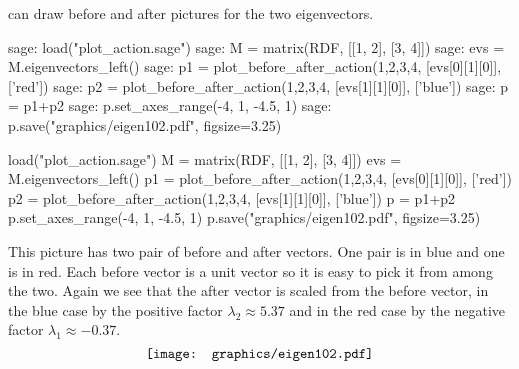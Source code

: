 \Sage{} can draw before and after pictures for the two eigenvectors.
\begin{sagecommandline}
sage: load("plot_action.sage")  
sage: M = matrix(RDF, [[1, 2], [3, 4]])
sage: evs = M.eigenvectors_left()  
sage: p1 = plot_before_after_action(1,2,3,4, [evs[0][1][0]], ['red']) 
sage: p2 = plot_before_after_action(1,2,3,4, [evs[1][1][0]], ['blue']) 
sage: p = p1+p2
sage: p.set_axes_range(-4, 1, -4.5, 1) 
sage: p.save("graphics/eigen102.pdf", figsize=3.25)
\end{sagecommandline}
\begin{sagesilent}
load("plot_action.sage")  
M = matrix(RDF, [[1, 2], [3, 4]])
evs = M.eigenvectors_left()  
p1 = plot_before_after_action(1,2,3,4, [evs[0][1][0]], ['red']) 
p2 = plot_before_after_action(1,2,3,4, [evs[1][1][0]], ['blue']) 
p = p1+p2
p.set_axes_range(-4, 1, -4.5, 1) 
p.save("graphics/eigen102.pdf", figsize=3.25)
\end{sagesilent}
\noindent
This picture has two pair of before and after vectors.
One pair is in blue and one is in red.
Each before vector is a unit vector so it is easy to pick it from among the
two.
Again we see that 
the after vector is scaled from the before vector, 
in the blue case by the positive factor $\lambda_2\approx 5.37$ and
in the red case by the negative factor $\lambda_1\approx -0.37$.
\begin{equation*}
  \vcenteredhbox{\texttt{[image: graphics/eigen102.pdf]}}
\end{equation*}




